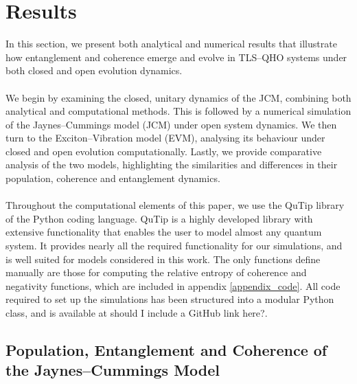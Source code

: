 \documentclass[12pt]{article}
\begin{document}
\newpage
\section{Results} \label{results}

In this section, we present both analytical and numerical results that illustrate how entanglement and coherence emerge and evolve in TLS--QHO systems under both closed and open evolution dynamics.\\
\\
We begin by examining the closed, unitary dynamics of the JCM, combining both analytical and computational methods. This is followed by a numerical simulation of the Jaynes--Cummings model (JCM) under open system dynamics. We then turn to the Exciton--Vibration model (EVM), analysing its behaviour under closed and open evolution computationally. Lastly, we provide comparative analysis of the two models, highlighting the similarities and differences in their population, coherence and entanglement dynamics. \\
\\
Throughout the computational elements of this paper, we use the QuTip library of the Python coding language. QuTip is a highly developed library with extensive functionality that enables the user to model almost any quantum system. It provides nearly all the required functionality for our simulations, and is well suited for models considered in this work. The only functions define manually are those for computing the relative entropy of coherence and negativity functions, which are included in appendix \ref{appendix_code}. All code required to set up the simulations has been structured into a modular Python class, and is available at {should I include a GitHub link here?}.

\subsection{Population, Entanglement and Coherence of the Jaynes--Cummings Model} \label{res_JCM}
\end{document}

